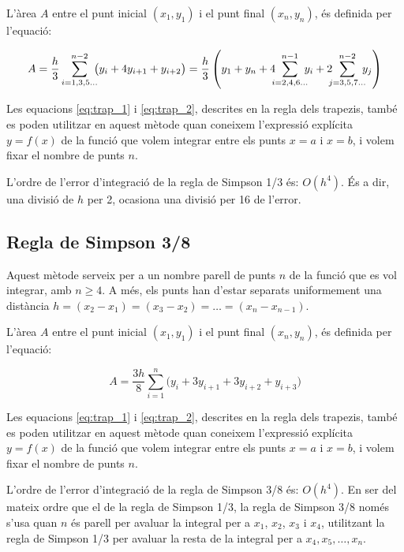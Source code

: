 L'àrea $A$ entre el punt inicial $(x_1, y_1)$ i el punt final $(x_n, y_n)$, és definida per l'equació:

 \begin{equation}\label{eq:simp_1_3}
   A =  \frac{h}{3} \sum_{i=1,3,5\dots}^{n-2} \hspace{-0.5em} \big( y_i + 4 y_{i+1} + y_{i+2} \big) =
   \frac{h}{3} \left( y_1 + y_n + 4 \hspace{-0.5em} \sum_{i=2,4,6\dots}^{n-1} \hspace{-0.5em} y_i +
   2 \hspace{-0.5em} \sum_{j=3,5,7\dots}^{n-2} \hspace{-0.5em} y_j \right)
 \end{equation}

Les equacions \eqref{eq:trap_1} i \eqref{eq:trap_2}, descrites en la regla dels trapezis, també es poden utilitzar en aquest mètode quan  coneixem l'expressió explícita $y=f(x)$ de la funció que volem integrar entre els punts $x=a$ i $x=b$, i volem fixar el nombre de punts $n$.

L'ordre de l'error d'integració de la regla de Simpson 1/3 és: $O(h^4)$. És a dir, una divisió de $h$ per 2, ocasiona una divisió per 16 de l'error.

 \subsection{Regla de Simpson 3/8}

Aquest mètode serveix per a un nombre parell de punts $n$ de la funció que es vol integrar, amb $n \geq 4$. A més, els punts han d'estar separats uniformement una distància $h = (x_2-x_1) = (x_3-x_2) = \dots = (x_n-x_{n-1})$.

L'àrea $A$ entre el punt inicial $(x_1, y_1)$ i el punt final $(x_n, y_n)$, és definida per l'equació:

 \begin{equation}\label{eq:simp_3_8}
   A =  \frac{3h}{8} \sum_{i=1}^{n} \big( y_i + 3 y_{i+1} + 3 y_{i+2} + y_{i+3}\big)
 \end{equation}

 Les equacions \eqref{eq:trap_1} i \eqref{eq:trap_2}, descrites en la regla dels trapezis, també es poden utilitzar en aquest mètode quan  coneixem l'expressió explícita $y=f(x)$ de la funció que volem integrar entre els punts $x=a$ i $x=b$, i volem fixar el nombre de punts $n$.

 L'ordre de l'error d'integració de la regla de Simpson 3/8 és: $O(h^4)$. En ser del mateix ordre que el de la regla de Simpson 1/3, la regla de Simpson 3/8 només s'usa quan $n$ és parell per avaluar la integral per a $x_1$, $x_2$, $x_3$ i $x_4$, utilitzant la regla de Simpson 1/3 per avaluar la resta de la integral per a  $x_4, x_5, \dotsc , x_n$.


